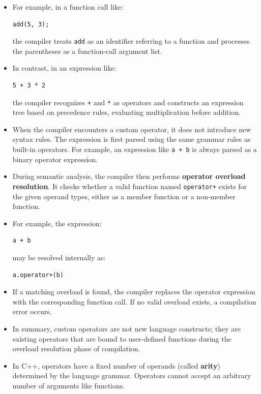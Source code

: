 \documentclass[10pt]{article}
\newcommand{\pbreak}{\vspace{30pt}}
\begin{document}
\begin{itemize}
\item For example, in a function call like:
\begin{verbatim}
add(5, 3);
\end{verbatim}
the compiler treats \verb|add| as an identifier referring to a function and processes the parentheses as a function-call argument list.

\item In contrast, in an expression like:
\begin{verbatim}
5 + 3 * 2
\end{verbatim}
the compiler recognizes \verb|+| and \verb|*| as operators and constructs an expression tree based on precedence rules, evaluating multiplication before addition.

\pbreak

\item When the compiler encounters a custom operator, it does not introduce new syntax rules. The expression is first parsed using the same grammar rules as built-in operators. For example, an expression like \verb|a + b| is always parsed as a binary operator expression.

\item During semantic analysis, the compiler then performs \textbf{operator overload resolution}. It checks whether a valid function named \verb|operator+| exists for the given operand types, either as a member function or a non-member function.

\item For example, the expression:
\begin{verbatim}
a + b
\end{verbatim}
may be resolved internally as:
\begin{verbatim}
a.operator+(b)
\end{verbatim}

\item If a matching overload is found, the compiler replaces the operator expression with the corresponding function call. If no valid overload exists, a compilation error occurs.

\item In summary, custom operators are not new language constructs; they are existing operators that are bound to user-defined functions during the overload resolution phase of compilation.

	\pbreak

\item In C++, operators have a fixed number of operands (called \textbf{arity}) determined by the language grammar. Operators cannot accept an arbitrary number of arguments like functions.


\end{itemize}
\end{document}
